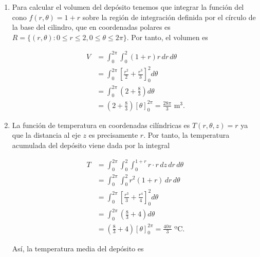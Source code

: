 \documentclass[
  spanish,
  a4paper,
]{scrreport}
\theoremstyle{definition}
\theoremstyle{remark}
\begin{document}
\begin{tcolorbox}[enhanced jigsaw, arc=.35mm, bottomrule=.15mm, bottomtitle=1mm, breakable, colback=white, colbacktitle=quarto-callout-tip-color!10!white, colframe=quarto-callout-tip-color-frame, coltitle=black, left=2mm, leftrule=.75mm, opacityback=0, opacitybacktitle=0.6, rightrule=.15mm, title=\textcolor{quarto-callout-tip-color}{\faLightbulb}\hspace{0.5em}{Solución}, titlerule=0mm, toprule=.15mm, toptitle=1mm]

\begin{enumerate}
\def\labelenumi{\alph{enumi}.}
\item
  Para calcular el volumen del depósito tenemos que integrar la función
  del cono \(f(r,\theta) = 1+r\) sobre la región de integración definida
  por el círculo de la base del cilindro, que en coordenadas polares es
  \(R=\{(r,\theta) : 0 \leq r \leq 2, 0 \leq \theta \leq 2\pi\}\). Por
  tanto, el volumen es

  \begin{align*}
  V 
  &= \int_0^{2\pi} \int_0^2 (1+r) r \, dr \, d\theta \\
  &= \int_0^{2\pi} \left[ \frac{r^2}{2} + \frac{r^3}{3} \right]_0^2 d\theta \\
  &= \int_0^{2\pi} \left( 2 + \frac{8}{3} \right) d\theta \\
  &= \left( 2 + \frac{8}{3} \right) [\theta]_0^{2\pi} 
  = \frac{28\pi}{3} \mbox{ m}^3.
  \end{align*}
\item
  La función de temperatura en coordenadas cilíndricas es
  \(T(r,\theta,z) = r\) ya que la distancia al eje \(z\) es precisamente
  \(r\). Por tanto, la temperatura acumulada del depósito viene dada por
  la integral

  \begin{align*}
  T &= 
  \int_0^{2\pi} \int_0^2 \int_0^{1+r} r\cdot r \, dz \, dr \, d\theta \\
  &= \int_0^{2\pi} \int_0^2 r^2(1+r) \, dr \, d\theta \\
  &= \int_0^{2\pi} \left[ \frac{r^3}{3} + \frac{r^4}{4} \right]_0^2 d\theta \\
  &= \int_0^{2\pi} \left( \frac{8}{3} + 4 \right) d\theta \\
  &= \left( \frac{8}{3} + 4 \right) [\theta]_0^{2\pi} 
  = \frac{40\pi}{3} \mbox{ ºC}.
  \end{align*}

  Así, la temperatura media del depósito es


\end{enumerate}
\end{tcolorbox}
\end{document}
